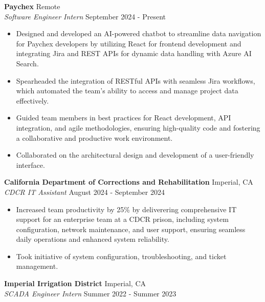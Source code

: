 \documentclass[a4paper]{article}
\begin{document}
\textbf{Paychex} \hfill Remote\\
\textit{Software Engineer Intern} \hfill September 2024 - Present 
\vspace{-1mm}
\begin{itemize} \itemsep 1pt
	\item Designed and developed an AI-powered chatbot to streamline data navigation for Paychex developers by utilizing React for frontend development and integrating Jira and REST APIs for dynamic data handling with Azure AI Search.
	\item Spearheaded the integration of RESTful APIs with seamless Jira workflows, which automated the team’s ability to access and manage project data effectively.
	\item Guided team members in best practices for React development, API integration, and agile methodologies, ensuring high-quality code and fostering a collaborative and productive work environment.
	\item Collaborated on the architectural design and development of a user-friendly interface.
\end{itemize}
\textbf{California Department of Corrections and Rehabilitation} \hfill Imperial, CA\\
\textit{CDCR IT Assistant} \hfill August 2024 - September 2024\\
\vspace{-1mm}
\begin{itemize} \itemsep 1pt
	\item Increased team productivity by 25\% by deliverering comprehensive IT support for an enterprise team at a CDCR prison, including system configuration, network maintenance, and user support, ensuring seamless daily operations and enhanced system reliability.
	\item Took initiative of system configuration, troubleshooting, and ticket management.
\end{itemize}
\textbf{Imperial Irrigation District} \hfill Imperial, CA\\
\textit{SCADA Engineer Intern} \hfill Summer 2022 - Summer 2023\\
\vspace{-1mm}
\end{document}
